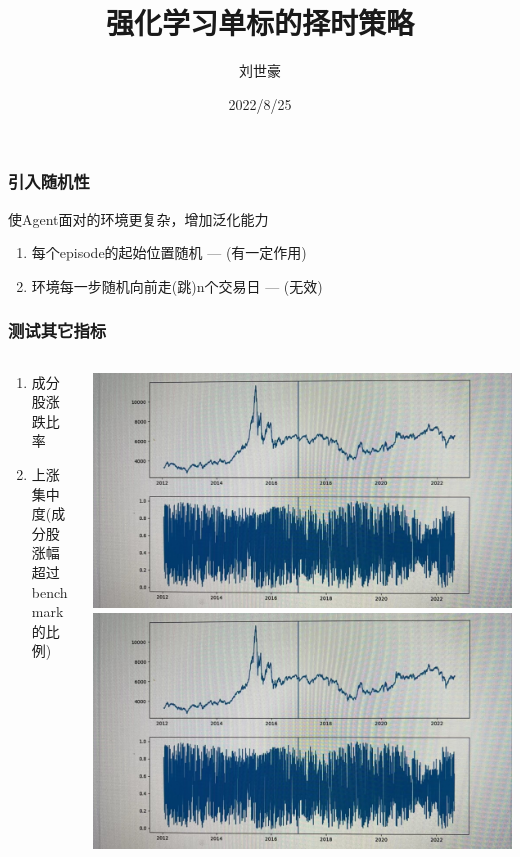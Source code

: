 \documentclass[aspectratio=169,9pt]{beamer}
\title{强化学习单标的择时策略}
\date[ISPN ’80]{2022/8/25}
\author[LiuShihao]{刘世豪}
\begin{document}
\begin{frame}[plain]            %
\titlepage
\end{frame}

\AtEndDocument
{
  \begin{frame}[plain]          %
  \end{frame}
}

\begin{frame}
  \frametitle{引入随机性}
  使Agent面对的环境更复杂，增加泛化能力
  \begin{enumerate}
  \item 每个episode的起始位置随机    --- (有一定作用)
  \item 环境每一步随机向前走(跳)n个交易日 --- (无效)
  \end{enumerate}
\end{frame}

\begin{frame}
  \frametitle{测试其它指标}
  \begin{columns}
    \begin{column}{0.4\textwidth}
      \begin{enumerate}
      \item 成分股涨跌比率
      \item 上涨集中度(成分股涨幅超过benchmark的比例)
      \end{enumerate}
    \end{column}
    \begin{column}{0.6\textwidth}
      \includegraphics[height=0.4\paperheight]{media/rise-rates.jpg}
      \includegraphics[height=0.4\paperheight]{media/rise-rates.jpg}
    \end{column}
  \end{columns}
\end{frame}
\end{document}

